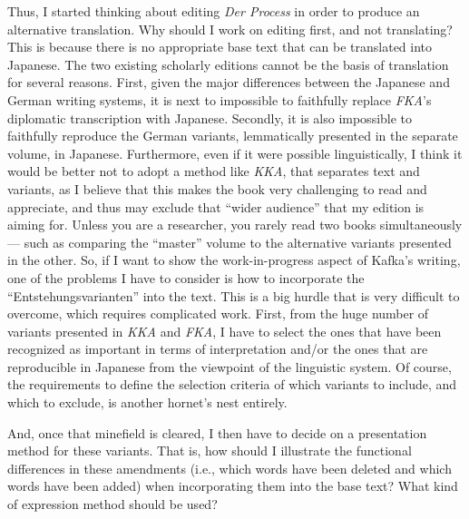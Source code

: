 \documentclass{article}
\begin{document}
Thus, I started thinking about editing \emph{Der Process} in order to
produce an alternative translation. Why should I work on editing first,
and not translating? This is because there is no appropriate base text
that can be translated into Japanese. The two existing scholarly
editions cannot be the basis of translation for several reasons. First, given the major differences between the Japanese and German
writing systems, it is next to impossible to faithfully replace
\emph{FKA}'s diplomatic transcription with Japanese. Secondly, it is
also impossible to faithfully reproduce the German variants,
lemmatically presented in the separate volume, in Japanese. Furthermore, even
if it were possible linguistically, I think it would be better not to
adopt a method like \emph{KKA}, that separates text and variants, as I
believe that this makes the book very challenging to read and
appreciate, and thus may exclude that ``wider audience'' that my edition
is aiming for. Unless you are a researcher, you rarely read two books
simultaneously –– such as comparing the ``master'' volume to the
alternative variants presented in the other. So, if I want to show the
work-in-progress aspect of Kafka's writing, one of the problems I have
to consider is how to incorporate the ``Entstehungsvarianten'' into the
text. This is a big hurdle that is very difficult to overcome, which
requires complicated work. First, from the huge
number of variants presented in \emph{KKA} and \emph{FKA}, I have to
select the ones that have been recognized as important in terms of
interpretation and/or the ones that are reproducible in Japanese from
the viewpoint of the linguistic system. Of course, the requirements to
define the selection criteria of which variants to include, and
which to exclude, is another hornet's nest entirely.

And, once that minefield is cleared, I then have to decide on a
presentation method for these variants. That is, how should I illustrate
the functional differences in these amendments (i.e., which words have
been deleted and which words have been added) when incorporating them
into the base text? What kind of expression method should be used?
\end{document}
